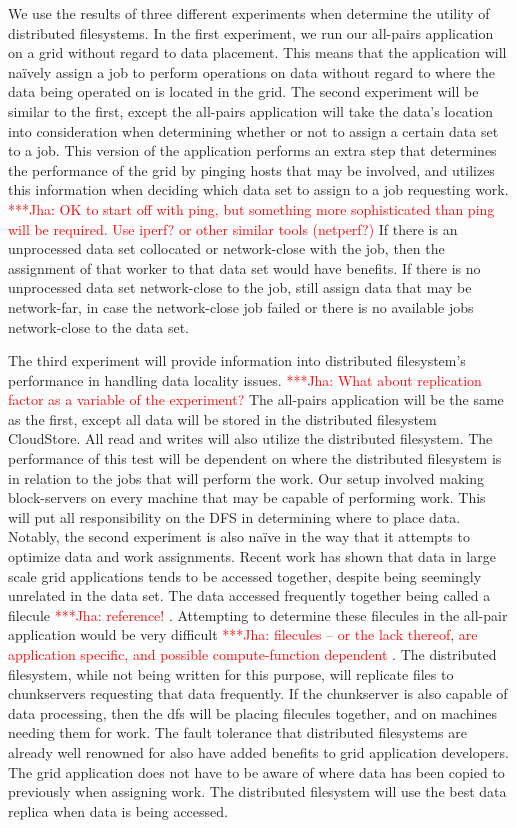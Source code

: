 \documentclass[a4paper,11pt]{article}
\newcommand{\jhanote}[1]{ {\textcolor{red} { ***Jha: #1 }}}
\newcommand{\jhanote}[1]{}
\begin{document}
We use the results of three different experiments when determine the utility of distributed filesystems.  In the first experiment, we run our all-pairs application on a grid without regard to data placement.  This means that the application will naïvely assign a job to perform operations on data without regard to where the data being operated on is located in the grid.
The second experiment will be similar to the first, except the all-pairs application will take the data's location into consideration when determining whether or not to assign a certain data set to a job. This version of the application performs an extra step that determines the performance of the grid by pinging hosts that may be involved, and utilizes this information when deciding which data set to assign to a job requesting work.  \jhanote{OK to start off with ping, but something more sophisticated than ping will be required. Use iperf? or other similar tools (netperf?)}  If there is an unprocessed data set collocated or network-close with the job, then the assignment of that worker to that data set would have benefits.  If there is no unprocessed data set network-close to the job, still assign data that may be network-far, in case the network-close job failed or there is no available jobs network-close to the data set.

The third experiment will provide information into distributed filesystem's performance in handling data locality issues.  \jhanote{What about replication factor as a variable of the experiment?}  The all-pairs application will be the same as the first, except all data will be stored in the distributed filesystem CloudStore.  All read and writes will also utilize the distributed filesystem.  The performance of this test will be dependent on where the distributed filesystem is in relation to the jobs that will perform the work.  Our setup involved making block-servers on every machine that may be capable of performing work.  This will put all responsibility on the DFS in determining where to place data.
Notably, the second experiment is also naïve in the way that it attempts to optimize data and work assignments.  Recent work has shown that data in large scale grid applications tends to be accessed together, despite being seemingly unrelated in the data set.  The data accessed frequently together being called a filecule \jhanote{reference!}.  Attempting to determine these filecules in the all-pair application would be very difficult \jhanote{filecules -- or the lack thereof, are application specific, and possible compute-function dependent}. The distributed filesystem, while not being written for this purpose, will replicate files to chunkservers requesting that data frequently.  If the chunkserver is also capable of data processing, then the dfs will be placing filecules together, and on machines needing them for work.  The fault tolerance that distributed filesystems are already well renowned for also have added benefits to grid application developers.  The grid application does not have to be aware of where data has been copied to previously when assigning work.  The distributed filesystem will use the best data replica when data is being accessed.
\end{document}

